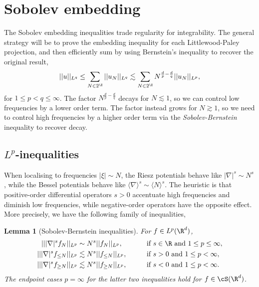 \documentclass[reqno]{amsart}
\newtheorem{lemma}[theorem]{Lemma}
\theoremstyle{definition}
\theoremstyle{remark}
\begin{document}
\section{Sobolev embedding}

The Sobolev embedding inequalities trade regularity for integrability. The general strategy will be to prove the embedding inequality for each Littlewood-Paley projection, and then efficiently sum by using Bernstein's inequality to recover the original result,
	\begin{align*}
		||u||_{L^q}
			\leq \sum_{N \in 2^\Z} ||u_N||_{L^q} \lesssim \sum_{N \in 2^\Z} N^{\frac{d}{p} - \frac{d}{q}} ||u_N||_{L^p},
	\end{align*}
for $1 \leq p < q \leq \infty$. The factor $N^{\frac{d}{p} - \frac{d}{q}}$ decays for $N \lesssim 1$, so we can control low frequencies by a lower order term. The factor instead grows for $N \gtrsim 1$, so we need to control high frequencies by a higher order term via the \textit{Sobolev-Bernstein} inequality to recover decay. 

\subsection{$L^p$-inequalities}

When localising to frequencies $|\xi| \sim N$, the Riesz potentials behave like $|\nabla|^s \sim N^s$, while the Bessel potentials behave like $\langle \nabla \rangle^s \sim \langle N \rangle^s$. The heuristic is that positive-order differential operators $s > 0$ accentuate high frequencies and diminish low frequencies, while negative-order operators have the opposite effect. More precisely, we have the following family of inequalities, 


\begin{lemma}[Sobolev-Bernstein inequalities] For $f \in L^p (\R^d)$, 
				\begin{alignat*}{2}
					|| |\nabla|^s f_N||_{L^p} 
						&\sim N^s ||f_N||_{L^p}, &&\qquad \text{if }s \in \R \text{ and } 1 \leq p \leq \infty, \\
					|| |\nabla|^s f_{\leq N}||_{L^p} 
						&\lesssim N^s ||f_{\leq N}||_{L^p}, &&\qquad\text{if }s > 0 \text{ and } 1 \leq p < \infty, \\
					|| |\nabla|^s f_{\geq N}||_{L^p} 
						&\lesssim N^s ||f_{\geq N}||_{L^p}, &&\qquad\text{if }s < 0 \text{ and } 1 \leq p < \infty.
				\end{alignat*}			
		The endpoint cases $p = \infty$ for the latter two inequalities hold for $f \in \cS (\R^d)$. 
\end{lemma}
\end{document}
